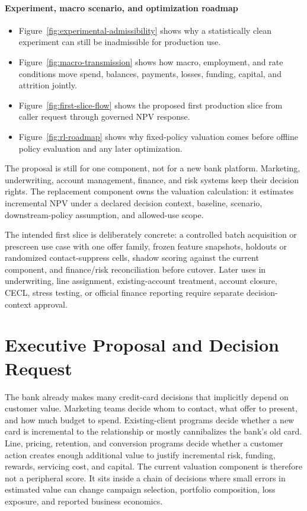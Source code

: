 \documentclass[11pt]{article}
\newcommand{\1}{\mathbf{1}}
\newcommand{\readerbox}[2]{\paragraph{#1}\begin{itemize}[leftmargin=1.5em,itemsep=0.1em,topsep=0.15em]#2\end{itemize}}
\begin{document}
\readerbox{Experiment, macro scenario, and optimization roadmap}{
  \item Figure~\ref{fig:experimental-admissibility} shows why a statistically
        clean experiment can still be inadmissible for production use.
  \item Figure~\ref{fig:macro-transmission} shows how macro, employment, and
        rate conditions move spend, balances, payments, losses, funding,
        capital, and attrition jointly.
  \item Figure~\ref{fig:first-slice-flow} shows the proposed first production
        slice from caller request through governed NPV response.
  \item Figure~\ref{fig:rl-roadmap} shows why fixed-policy valuation comes
        before offline policy evaluation and any later optimization.
}

The proposal is still for one component, not for a new bank platform.  Marketing,
underwriting, account management, finance, and risk systems keep their decision
rights.  The replacement component owns the valuation calculation: it estimates
incremental NPV under a declared decision context, baseline, scenario,
downstream-policy assumption, and allowed-use scope.

The intended first slice is deliberately concrete: a controlled batch
acquisition or prescreen use case with one offer family, frozen feature
snapshots, holdouts or randomized contact-suppress cells, shadow scoring against
the current component, and finance/risk reconciliation before cutover. Later
uses in underwriting, line assignment, existing-account treatment, account
closure, CECL, stress testing, or official finance reporting require separate
decision-context approval.

\tableofcontents
\clearpage

\section{Executive Proposal and Decision Request}
\label{sec:executive-charter}

The bank already makes many credit-card decisions that implicitly depend on
customer value. Marketing teams decide whom to contact, what offer to present,
and how much budget to spend. Existing-client programs decide whether a new
card is incremental to the relationship or mostly cannibalizes the bank's old
card. Line, pricing, retention, and conversion programs decide whether a
customer action creates enough additional value to justify incremental risk,
funding, rewards, servicing cost, and capital. The current valuation component
is therefore not a peripheral score. It sits inside a chain of decisions where
small errors in estimated value can change campaign selection, portfolio
composition, loss exposure, and reported business economics.
\end{document}
